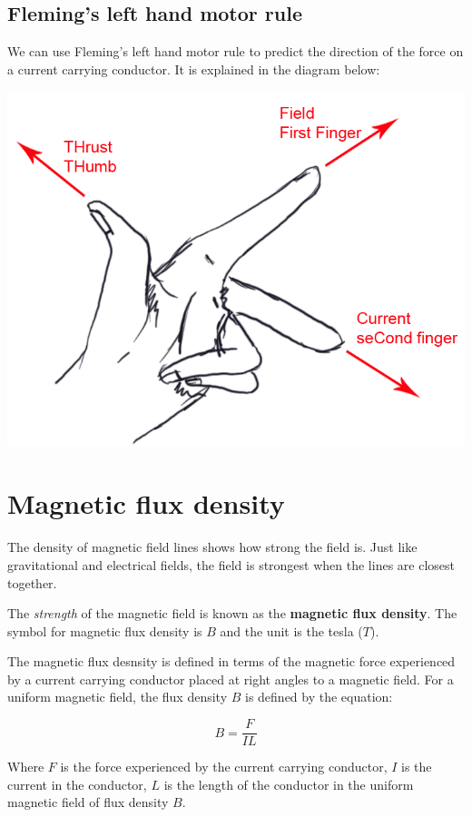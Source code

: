 \documentclass{article}
\begin{document}
\subsection*{Fleming's left hand motor rule}

We can use Fleming's left hand motor rule to predict the direction of the force
on a current carrying conductor. It is explained in the diagram below:

\begin{center}
	\includegraphics[scale=0.4]{left_hand_rule}
\end{center}

\section*{Magnetic flux density}

The density of magnetic field lines shows how strong the field is. Just like
gravitational and electrical fields, the field is strongest when the lines are
closest together.

The {\it strength} of the magnetic field is known as the {\bf magnetic flux
density}. The symbol for magnetic flux density is $B$ and the unit is the tesla
($T$).

The magnetic flux desnsity is defined in terms of the magnetic force experienced
by a current carrying conductor placed at right angles to a magnetic field. For
a uniform magnetic field, the flux density $B$ is defined by the equation:

\[
	B = \frac{F}{IL}
\]

Where $F$ is the force experienced by the current carrying conductor, $I$ is the
current in the conductor, $L$ is the length of the conductor in the uniform
magnetic field of flux density $B$. 
\end{document}
